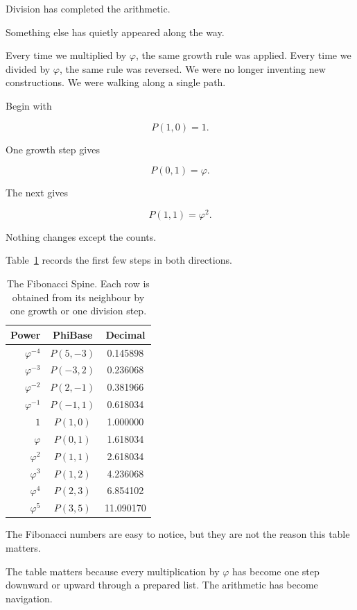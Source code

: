 \label{stone:spine}

Division has completed the arithmetic.

Something else has quietly appeared along the way.

Every time we multiplied by \(\varphi\), the same growth rule was applied. Every time we divided by \(\varphi\), the same rule was reversed. We were no longer inventing new constructions. We were walking along a single path.

Begin with

\[
P(1,0)=1.
\]

One growth step gives

\[
P(0,1)=\varphi.
\]

The next gives

\[
P(1,1)=\varphi^{2}.
\]

Nothing changes except the counts.

Table~\ref{tab:spine} records the first few steps in both directions.

\begin{table}[htbp]
\centering
\caption{The Fibonacci Spine. Each row is obtained from its neighbour by one growth or one division step.}
\label{tab:spine}
\begin{tabular}{rcc}
\hline
Power & PhiBase & Decimal\\
\hline
$\varphi^{-4}$ & $P(5,-3)$  & 0.145898\\
$\varphi^{-3}$ & $P(-3,2)$  & 0.236068\\
$\varphi^{-2}$ & $P(2,-1)$  & 0.381966\\
$\varphi^{-1}$ & $P(-1,1)$  & 0.618034\\
$1$            & $P(1,0)$   & 1.000000\\
$\varphi$      & $P(0,1)$   & 1.618034\\
$\varphi^{2}$  & $P(1,1)$   & 2.618034\\
$\varphi^{3}$  & $P(1,2)$   & 4.236068\\
$\varphi^{4}$  & $P(2,3)$   & 6.854102\\
$\varphi^{5}$  & $P(3,5)$   &11.090170\\
\hline
\end{tabular}
\end{table}

The Fibonacci numbers are easy to notice, but they are not the reason this table matters.

The table matters because every multiplication by \(\varphi\) has become one step downward or upward through a prepared list. The arithmetic has become navigation.

